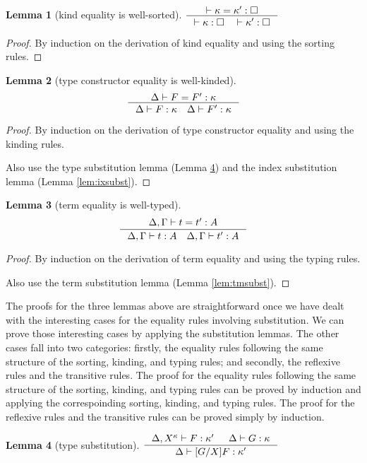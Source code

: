 \documentclass[preprint]{sigplanconf}
\theoremstyle{plain}
\newtheorem{lemma}{Lemma}
\theoremstyle{remark}
\theoremstyle{definition}
\begin{document}
\begin{lemma}[kind equality is well-sorted]\label{lem:wfeqkind}
$ \inference{|- \kappa = \kappa':\square}
	{|- \kappa:\square \quad |- \kappa':\square} $
\end{lemma}
\begin{proof}
	By induction on the derivation of kind equality
	and using the sorting rules.
\end{proof}

\begin{lemma}[type constructor equality is well-kinded]\label{lem:wfeqtype}
\[ \inference{\Delta |- F = F':\kappa}
	{\Delta |- F:\kappa \quad \Delta |- F':\kappa}
\]
\end{lemma}
\begin{proof}
	By induction on the derivation of type constructor equality
	and using the kinding rules.

	Also use the type substitution lemma (Lemma \ref{lem:tysubst})
	and the index substitution lemma (Lemma \ref{lem:ixsubst}).
\end{proof}

\begin{lemma}[term equality is well-typed]\label{lem:wfeqterm}
\[ \inference{\Delta,\Gamma |- t = t':A}
	{\Delta,\Gamma |- t:A \quad \Delta,\Gamma |- t':A}
\]
\end{lemma}
\begin{proof}
	By induction on the derivation of term equality
	and using the typing rules.

	Also use the term substitution lemma (Lemma \ref{lem:tmsubst}).
\end{proof}

The proofs for the three lemmas above are straightforward
once we have dealt with the interesting cases for the equality rules
involving substitution. We can prove those interesting cases
by applying the substitution lemmas. The other cases fall into two
categories: firstly, the equality rules following the same structure of
the sorting, kinding, and typing rules; and secondly, the reflexive
rules and the transitive rules. The proof for the equality rules
following the same structure of the sorting, kinding, and typing rules
can be proved by induction and applying the correspoinding
sorting, kinding, and typing rules. The proof for the reflexive rules
and the transitive rules can be proved simply by induction.

\begin{lemma}[type substitution]\label{lem:tysubst}
$ \inference{\Delta,X^\kappa |- F:\kappa' & \Delta |- G:\kappa}
	{\Delta |- [G/X]F:\kappa'} $
\end{lemma}
\end{document}
